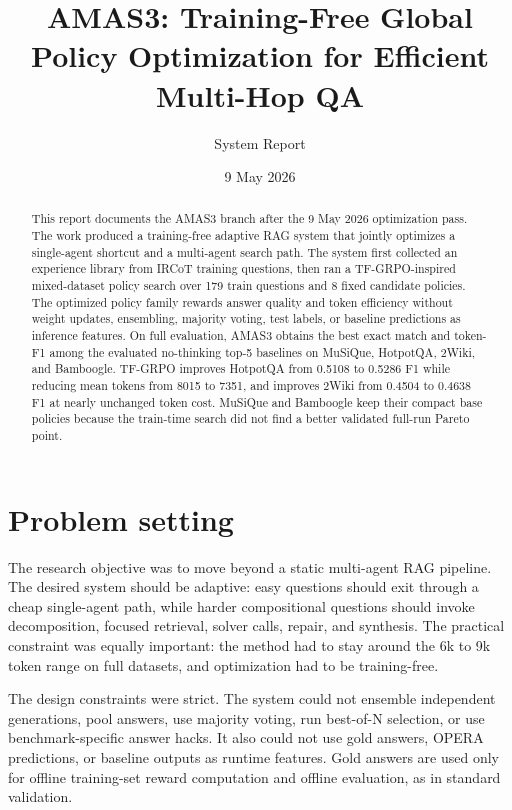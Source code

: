 \documentclass[10pt]{article}
\title{\textbf{AMAS3: Training-Free Global Policy Optimization for Efficient Multi-Hop QA}}
\author{System Report}
\date{9 May 2026}
\begin{document}
\maketitle

\begin{abstract}
This report documents the AMAS3 branch after the 9 May 2026 optimization pass. The work produced a training-free adaptive RAG system that jointly optimizes a single-agent shortcut and a multi-agent search path. The system first collected an experience library from IRCoT training questions, then ran a TF-GRPO-inspired mixed-dataset policy search over 179 train questions and 8 fixed candidate policies. The optimized policy family rewards answer quality and token efficiency without weight updates, ensembling, majority voting, test labels, or baseline predictions as inference features. On full evaluation, AMAS3 obtains the best exact match and token-F1 among the evaluated no-thinking top-5 baselines on MuSiQue, HotpotQA, 2Wiki, and Bamboogle. TF-GRPO improves HotpotQA from 0.5108 to 0.5286 F1 while reducing mean tokens from 8015 to 7351, and improves 2Wiki from 0.4504 to 0.4638 F1 at nearly unchanged token cost. MuSiQue and Bamboogle keep their compact base policies because the train-time search did not find a better validated full-run Pareto point.
\end{abstract}

\section{Problem setting}

The research objective was to move beyond a static multi-agent RAG pipeline. The desired system should be adaptive: easy questions should exit through a cheap single-agent path, while harder compositional questions should invoke decomposition, focused retrieval, solver calls, repair, and synthesis. The practical constraint was equally important: the method had to stay around the 6k to 9k token range on full datasets, and optimization had to be training-free.

The design constraints were strict. The system could not ensemble independent generations, pool answers, use majority voting, run best-of-N selection, or use benchmark-specific answer hacks. It also could not use gold answers, OPERA predictions, or baseline outputs as runtime features. Gold answers are used only for offline training-set reward computation and offline evaluation, as in standard validation.
\end{document}
